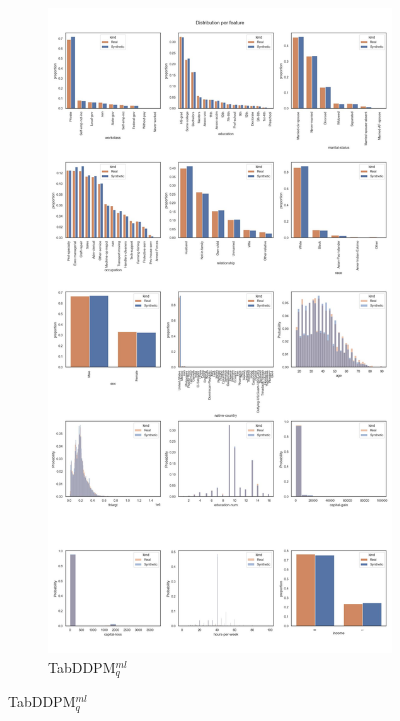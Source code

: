 \newpage
\begin{landscape}
	\begin{figure}[h]
		\centering
		\hfill
		\begin{subfigure}{0.3\linewidth}
			\includegraphics[height=\textheight,width=\linewidth,keepaspectratio]{images/distributions_full/tab-ddpm.jpg}
			\caption{TabDDPM$^{ml}_q$}
		\end{subfigure}

\end{figure}
\end{landscape}
